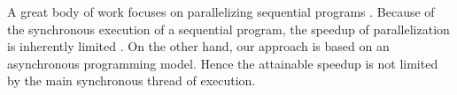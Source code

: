 A great body of work focuses on parallelizing sequential programs \cite{Banerjee2013,Li2012,Matsakis2012a,Radoi2014}. %
Because of the synchronous execution of a sequential program, the speedup of parallelization is inherently limited \cite{Amdahl1967,Gunther2008}.
On the other hand, our approach is based on an asynchronous programming model.
Hence the attainable speedup is not limited by the main synchronous thread of execution.


